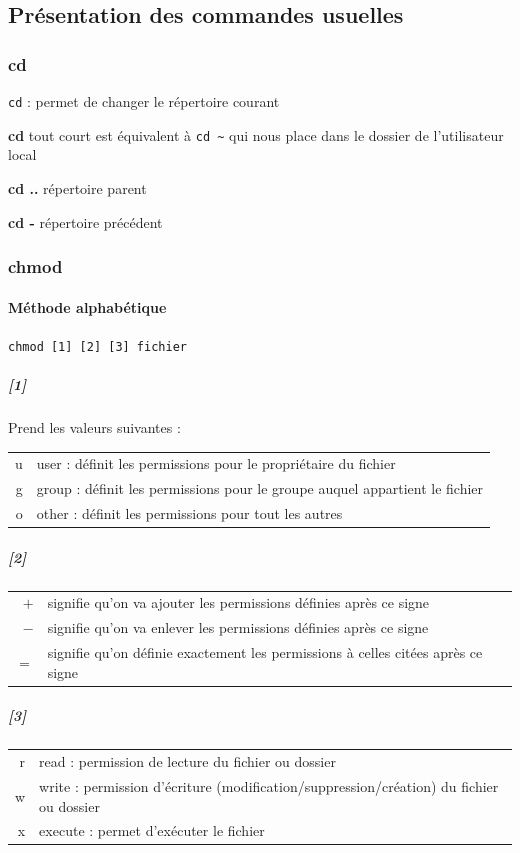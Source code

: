 \documentclass[a4paper,twoside]{article}
\begin{document}
\subsection{Présentation des commandes usuelles}

\subsubsection{cd}
\verb|cd| : permet de changer le répertoire courant

\textbf{cd} tout court est équivalent à \verb|cd ~|  qui nous place dans le dossier de l'utilisateur local

\textbf{cd ..} répertoire parent

\textbf{cd -} répertoire précédent

\subsubsection{chmod}
\paragraph{Méthode alphabétique}
\verb|chmod [1] [2] [3] fichier|
\subparagraph{[1]}
Prend les valeurs suivantes :
\begin{center}
\begin{tabular}{rl}
u & user : définit les permissions pour le propriétaire du fichier\\
g & group : définit les permissions pour le groupe auquel appartient le fichier\\
o & other : définit les permissions pour tout les autres
\end{tabular}
\end{center}

\subparagraph{[2]}
\begin{tabular}{rl}
$+$ & signifie qu'on va ajouter les permissions définies après ce signe\\
$-$ & signifie qu'on va enlever les permissions définies après ce signe\\
$=$ & signifie qu'on définie exactement les permissions à celles citées après ce signe
\end{tabular}

\subparagraph{[3]}

\begin{tabular}{rl}
r & read : permission de lecture du fichier ou dossier\\
w & write : permission d'écriture (modification/suppression/création) du fichier ou dossier\\
x & execute : permet d'exécuter le fichier
\end{tabular}
\end{document}
